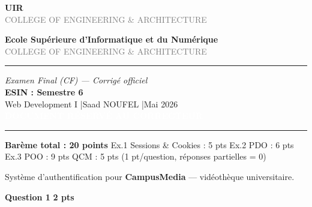 \documentclass[11pt,a4paper]{article}
\newcommand{\pts}[1]{%
  \hfill\colorbox{pointsbg}{\textcolor{uirgold}{\bfseries\small #1 pts}}%
}
\begin{document}
\thispagestyle{empty}

\noindent
\begin{minipage}[c]{0.42\textwidth}
  \textcolor{uirblue}{\Large\bfseries UIR}\\
  \textcolor{gray}{\footnotesize COLLEGE OF ENGINEERING \& ARCHITECTURE}
\end{minipage}%
\hfill
\begin{minipage}[c]{0.52\textwidth}
  \raggedleft
  \textcolor{uirblue}{\textbf{Ecole Supérieure d'Informatique et du Numérique}}\\
  \textcolor{gray}{\footnotesize COLLEGE OF ENGINEERING \& ARCHITECTURE}
\end{minipage}

\vspace{6pt}
\noindent\rule{\linewidth}{0.8pt}

\begin{center}
  \vspace{4pt}
  {\large\itshape Examen Final (CF) --- Corrigé officiel}\\[6pt]
  {\LARGE\bfseries\color{uirblue} ESIN : Semestre 6}\\[4pt]
  {\large Web Development I \quad|\quad Saad NOUFEL \quad|\quad Mai 2026}\\[2pt]
  \colorbox{correctgreen}{\textcolor{white}{\bfseries\large DOCUMENT RÉSERVÉ AU CORRECTEUR}}
\end{center}

\noindent\rule{\linewidth}{0.8pt}

\vspace{4pt}
\begin{tcolorbox}[notebox]
  \textbf{Barème total : 20 points} \quad
  Ex.1 Sessions \& Cookies : 5 pts \quad
  Ex.2 PDO : 6 pts \quad
  Ex.3 POO : 9 pts \quad
  QCM : 5 pts (1 pt/question, réponses partielles = 0)
\end{tcolorbox}

\begin{tcolorbox}[exbox, title={Exercice 1 \quad Sessions \& Cookies \hfill /5 pts}]
Système d'authentification pour \textbf{CampusMedia} --- vidéothèque universitaire.
\end{tcolorbox}

\noindent\textbf{Question 1}\pts{2}
\end{document}
